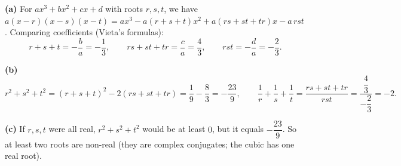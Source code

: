 \textbf{(a)} For $ax^3+bx^2+cx+d$ with roots $r,s,t$, we have $a(x-r)(x-s)(x-t)=ax^3-a(r+s+t)x^2+a(rs+st+tr)x-a\,rst$. Comparing coefficients (Vieta's formulas):
\[r+s+t=-\dfrac {b}{a}=-\dfrac{1}{3},\qquad rs+st+tr=\dfrac {c}{a}=\dfrac{4}{3},\qquad rst=-\dfrac {d}{a}=-\dfrac{2}{3} .\]

\textbf{(b)}
\[r^2+s^2+t^2=(r+s+t)^2-2(rs+st+tr)=\dfrac{1}{9}-\dfrac{8}{3}=\boxed{-\dfrac{23}{9}},\qquad \dfrac{1}{r}+\dfrac{1}{s}+\dfrac{1}{t}=\dfrac{rs+st+tr}{rst}=\dfrac{\dfrac{4}{3}}{-\dfrac{2}{3}}=\boxed{-2}.\]

\textbf{(c)} If $r,s,t$ were all real, $r^2+s^2+t^2$ would be at least $0$, but it equals $-\dfrac{23}{9}$. So at least two roots are non-real (they are complex conjugates; the cubic has one real root).
